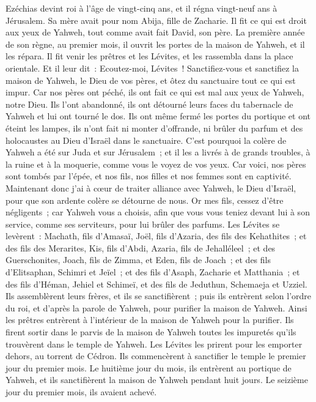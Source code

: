 \begin{multicols}{2}
\VerseOne{}Ezéchias devint roi à l'âge de vingt-cinq ans, et il régna vingt-neuf ans à Jérusalem. Sa mère avait pour nom Abija, fille de Zacharie.
Il fit ce qui est droit aux yeux de Yahweh, tout comme avait fait David, son père.
La première année de son règne, au premier mois, il ouvrit les portes de la maison de Yahweh, et il les répara.
Il fit venir les prêtres et les Lévites, et les rassembla dans la place orientale.
Et il leur dit~: Ecoutez-moi, Lévites~! Sanctifiez-vous et sanctifiez la maison de Yahweh, le Dieu de vos pères, et ôtez du sanctuaire tout ce qui est impur.
Car nos pères ont péché, ils ont fait ce qui est mal aux yeux de Yahweh, notre Dieu. Ils l'ont abandonné, ils ont détourné leurs faces du tabernacle de Yahweh et lui ont tourné le dos.
Ils ont même fermé les portes du portique et ont éteint les lampes, ils n'ont fait ni monter d'offrande, ni brûler du parfum et des holocaustes au Dieu d'Israël dans le sanctuaire.
C'est pourquoi la colère de Yahweh a été sur Juda et sur Jérusalem~; et il les a livrés à de grands troubles, à la ruine et à la moquerie, comme vous le voyez de vos yeux.
Car voici, nos pères sont tombés par l'épée, et nos fils, nos filles et nos femmes sont en captivité.
Maintenant donc j'ai à cœur de traiter alliance avec Yahweh, le Dieu d'Israël, pour que son ardente colère se détourne de nous.
Or mes fils, cessez d'être négligents~; car Yahweh vous a choisis, afin que vous vous teniez devant lui à son service, comme ses serviteurs, pour lui brûler des parfums.
Les Lévites se levèrent~: Machath, fils d'Amasaï, Joël, fils d'Azaria, des fils des Kehathites~; et des fils des Merarites, Kis, fils d'Abdi, Azaria, fils de Jehalléleel~; et des Guerschonites, Joach, fils de Zimma, et Eden, fils de Joach~;
et des fils d'Elitsaphan, Schimri et Jeïel~; et des fils d'Asaph, Zacharie et Matthania~;
et des fils d'Héman, Jehiel et Schimeï, et des fils de Jeduthun, Schemaeja et Uzziel.
Ils assemblèrent leurs frères, et ils se sanctifièrent~; puis ils entrèrent selon l'ordre du roi, et d'après la parole de Yahweh, pour purifier la maison de Yahweh.
Ainsi les prêtres entrèrent à l'intérieur de la maison de Yahweh pour la purifier. Ils firent sortir dans le parvis de la maison de Yahweh toutes les impuretés qu'ils trouvèrent dans le temple de Yahweh. Les Lévites les prirent pour les emporter dehors, au torrent de Cédron.
Ils commencèrent à sanctifier le temple le premier jour du premier mois. Le huitième jour du mois, ils entrèrent au portique de Yahweh, et ils sanctifièrent la maison de Yahweh pendant huit jours. Le seizième jour du premier mois, ils avaient achevé.

\end{multicols}
